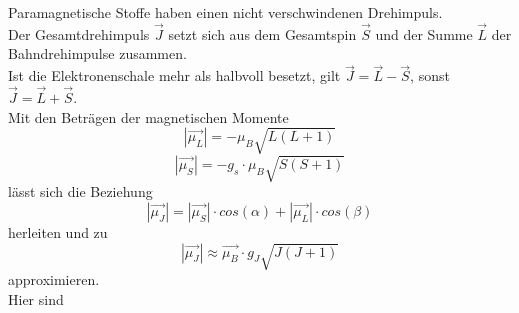 Paramagnetische Stoffe haben einen nicht verschwindenen Drehimpuls.\\
Der Gesamtdrehimpuls $\vec{J}$ setzt sich aus dem Gesamtspin $\vec{S}$ und der Summe $\vec{L}$ der Bahndrehimpulse zusammen.\\
Ist die Elektronenschale mehr als halbvoll besetzt, gilt $\vec{J} = \vec{L} - \vec{S}$, sonst $\vec{J} = \vec{L} + \vec{S}$.\\

Mit den Beträgen der magnetischen Momente 
\begin{equation}
    |\vec{\mu_L}| = -\mu_B \sqrt{L(L+1)}
\end{equation}
\begin{equation}
    |\vec{\mu_S}| = - g_s \cdot \mu_B \sqrt{S(S+1)}
\end{equation}
lässt sich die Beziehung 
\begin{equation}
    |\vec{\mu_J}| = |\vec{\mu_S}| \cdot cos(\alpha) + |\vec{\mu_L}| \cdot cos(\beta)
\end{equation}
herleiten und zu 
\begin{equation}
    |\vec{\mu_J}| \approx \vec{\mu_B}\cdot g_J \sqrt{J(J+1)}
\end{equation}
approximieren.\\
Hier sind 